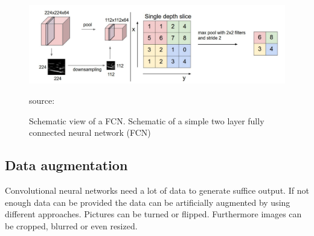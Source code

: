 \begin{figure}[H]
	\centering
	\includegraphics[width=\linewidth]{bilder/grundlagen/pooling.png}
	\caption{Schematic view of a FCN. Schematic of a simple two layer fully connected neural network (FCN)} source:\cite{Component}
	\label{fig:COMPONENT}
\end{figure}

\subsection{Data augmentation}
Convolutional neural networks need a lot of data to generate suffice output. If not enough data can be provided the data can be artificially augmented by using different approaches. Pictures can be turned or flipped. Furthermore images can be cropped, blurred or even resized. 
